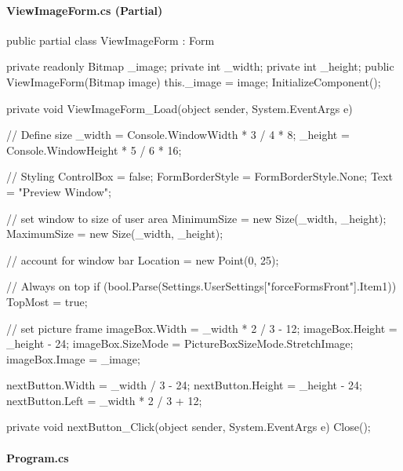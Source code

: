 \begin{flushleft}
    \paragraph{ViewImageForm.cs (Partial)}
    \begin{cscode}
public partial class ViewImageForm : Form
{
    private readonly Bitmap _image;
    private int _width;
    private int _height;
    public ViewImageForm(Bitmap image)
    {
        this._image = image;
        InitializeComponent();
    }

    private void ViewImageForm_Load(object sender, System.EventArgs e)
    {
        // Define size
        _width = Console.WindowWidth * 3 / 4 * 8;
        _height = Console.WindowHeight * 5 / 6 * 16;

        // Styling
        ControlBox = false;
        FormBorderStyle = FormBorderStyle.None;
        Text = "Preview Window";

        // set window to size of user area
        MinimumSize = new Size(_width, _height);
        MaximumSize = new Size(_width, _height);

        // account for window bar
        Location = new Point(0, 25);

        // Always on top
        if (bool.Parse(Settings.UserSettings["forceFormsFront"].Item1)) TopMost = true;

        // set picture frame
        imageBox.Width = _width * 2 / 3 - 12;
        imageBox.Height = _height - 24;
        imageBox.SizeMode = PictureBoxSizeMode.StretchImage;
        imageBox.Image = _image;

        nextButton.Width = _width / 3 - 24;
        nextButton.Height = _height - 24;
        nextButton.Left = _width * 2 / 3 + 12;
    }

    private void nextButton_Click(object sender, System.EventArgs e)
    {
        Close();
    }
}
    \end{cscode}
\pagebreak
    
    
    \paragraph{Program.cs}
\end{flushleft}
